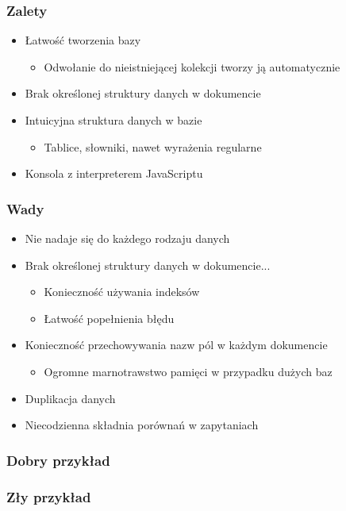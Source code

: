 \documentclass{beamer}
\begin{document}
  \begin{frame}
    \frametitle{Zalety}
    \begin{itemize}
      \item Łatwość tworzenia bazy
      \begin{itemize}
        \item Odwołanie do nieistniejącej kolekcji tworzy ją automatycznie
      \end{itemize}
      \item Brak określonej struktury danych w dokumencie
      \item Intuicyjna struktura danych w bazie
      \begin{itemize}
        \item Tablice, słowniki, nawet wyrażenia regularne
      \end{itemize}
      \item Konsola z interpreterem JavaScriptu
    \end{itemize}
  \end{frame}

  \begin{frame}
    \frametitle{Wady}
    \begin{itemize}
      \item Nie nadaje się do każdego rodzaju danych
      \item Brak określonej struktury danych w dokumencie...
      \begin{itemize}
        \item Konieczność używania indeksów
		\item Łatwość popełnienia błędu
      \end{itemize}
      \item Konieczność przechowywania nazw pól w każdym dokumencie
      \begin{itemize}
        \item Ogromne marnotrawstwo pamięci w przypadku dużych baz
      \end{itemize}
      \item Duplikacja danych
      \item Niecodzienna składnia porównań w zapytaniach
    \end{itemize}
  \end{frame}

  \begin{frame}
    \frametitle{Dobry przykład}
  \end{frame}

  \begin{frame}
    \frametitle{Zły przykład}
  \end{frame}
\end{document}

